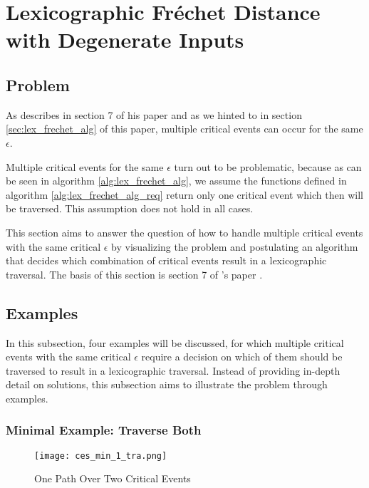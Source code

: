 
\section{Lexicographic Fréchet Distance with Degenerate Inputs}\label{lex_frechet_deg}

\subsection{Problem}

As \citeauthor{rotelex} describes in section 7 of his paper  and as we hinted to in section \ref{sec:lex_frechet_alg} of this paper, multiple critical events can occur for the same $\epsilon$.

Multiple critical events for the same $\epsilon$ turn out to be problematic, because as can be seen in algorithm \ref{alg:lex_frechet_alg}, we assume the functions defined in algorithm \ref{alg:lex_frechet_alg_req} return only one critical event which then will be traversed. This assumption does not hold in all cases.

This section aims to answer the question of how to handle multiple critical events with the same critical $\epsilon$ by visualizing the problem and postulating an algorithm that decides which combination of critical events result in a lexicographic traversal. The basis of this section is section 7 of \citeauthor{rotelex}'s paper \cite{rotelex}.


\subsection{Examples}

In this subsection, four examples will be discussed, for which multiple critical events with the same critical $\epsilon$ require a decision on which of them should be traversed to result in a lexicographic traversal. Instead of providing in-depth detail on solutions, this subsection aims to illustrate the problem through examples.


\subsubsection{Minimal Example: Traverse Both}\label{sec:ces_min_1}

\begin{figure}[H]
    \centering
    
    \texttt{[image: ces\_min\_1\_tra.png]}
		
	\caption{One Path Over Two Critical Events}
    \label{fig:ces_min_1}
\end{figure}

